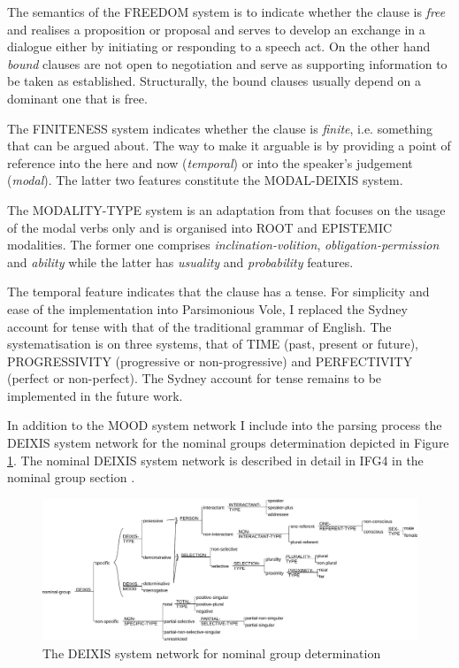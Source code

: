     The semantics of the FREEDOM system is to indicate whether the clause is \textit{free} and realises a proposition or proposal and serves to develop an exchange in a dialogue either by initiating or responding to a speech act. On the other hand \textit{bound} clauses are not open to negotiation and serve as supporting information to be taken as established. Structurally, the bound clauses usually depend on a dominant one that is free.
    
    The FINITENESS system indicates whether the clause is \textit{finite}, i.e. something that can be argued about. The way to make it arguable is by providing a point of reference into the here and now (\textit{temporal}) or into the speaker's judgement (\textit{modal}). The latter two features constitute the MODAL-DEIXIS system. 
    
    The MODALITY-TYPE system is an adaptation from \citet[689--692]{Halliday2013} that focuses on the usage of the modal verbs only and is organised into ROOT and EPISTEMIC modalities. The former one comprises \textit{inclination-volition}, \textit{obligation-permission} and \textit{ability} while the latter has \textit{usuality} and \textit{probability} features.
    
    The temporal feature indicates that the clause has a tense. For simplicity and ease of the implementation into Parsimonious Vole, I replaced the Sydney account for tense with that of the traditional grammar of English. The systematisation is on three systems, that of TIME (past, present or future), PROGRESSIVITY (progressive or non-progressive) and PERFECTIVITY (perfect or non-perfect). The Sydney account for tense remains to be implemented in the future work.    
    
    In addition to the MOOD system network I include into the parsing process the DEIXIS system network for the nominal groups determination depicted in Figure \ref{fig:ng-determination}. The nominal DEIXIS system network is described in detail in IFG4 in the nominal group section \citep[364--396]{Halliday2013}. 
    
    \begin{figure}[!ht]
        \centering
        \includegraphics[width=\linewidth]{Figures/SFL-grammar/determination-system.pdf}
        \caption{The DEIXIS system network for nominal group determination \citep[366]{Halliday2013}}
        \label{fig:ng-determination}
    \end{figure}

